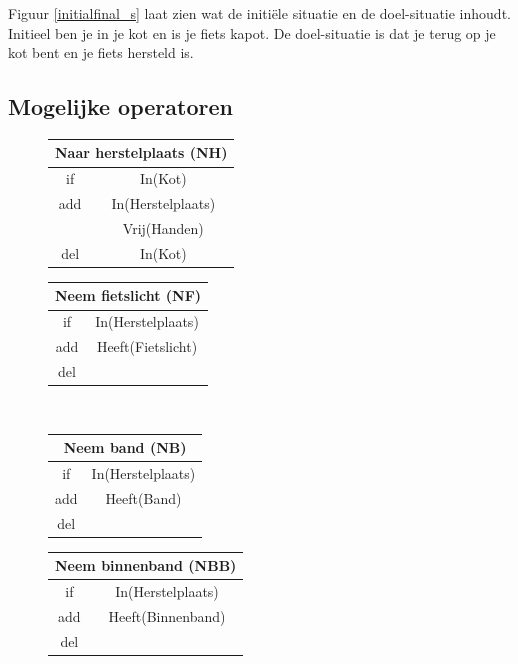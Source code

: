 \documentclass{article}
\begin{document}
Figuur \ref{initialfinal_s} laat zien wat de initiële situatie en de doel-situatie inhoudt. Initieel ben je in je kot en is je fiets kapot. De doel-situatie is dat je terug op je kot bent en je fiets hersteld is.

\subsection{Mogelijke operatoren}

\begin{figure}[H]
\centering
\begin{tabular}{|c|c|}
    \multicolumn{2}{c}{Naar herstelplaats (NH)}\\
    \hline
    if & In(Kot)\\
    \hline
    add & In(Herstelplaats)\\
        & Vrij(Handen)\\
    \hline
    del & In(Kot)\\
    \hline
\end{tabular}
\hspace{0.25cm}
\begin{tabular}{|c|c|}
    \multicolumn{2}{c}{Neem fietslicht (NF)}\\
    \hline
    if & In(Herstelplaats)\\
    \hline
    add & Heeft(Fietslicht)\\
    \hline
    del & \\
    \hline
\end{tabular}
\\\vspace{0.25cm}
\begin{tabular}{|c|c|}
    \multicolumn{2}{c}{Neem band (NB)}\\
    \hline
    if & In(Herstelplaats)\\
    \hline
    add & Heeft(Band)\\
    \hline
    del & \\
    \hline
\end{tabular}
\hspace{0.25cm}
\begin{tabular}{|c|c|}
    \multicolumn{2}{c}{Neem binnenband (NBB)}\\
    \hline
    if & In(Herstelplaats)\\
    \hline
    add & Heeft(Binnenband)\\
    \hline
    del & \\
    \hline
\end{tabular}
\\\vspace{0.25cm}

\end{figure}
\end{document}

